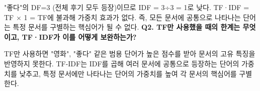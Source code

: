 \documentclass[a4paper,11pt]{article}
\begin{document}
\noindent\small\color{gray} "좋다"의 DF=3 (전체 후기 모두 등장)이므로 IDF = 3÷3 = 1로 낮다. TF·IDF = TF × 1 = TF에 불과해 가중치 효과가 없다. 즉, 모든 문서에 공통으로 나타나는 단어는 특정 문서를 구별하는 핵심어가 될 수 없다.
\vspace{2mm}
\noindent\textbf{Q2. TF만 사용했을 때의 한계는 무엇이고, TF·IDF가 이를 어떻게 보완하는가?}

\noindent\small\color{gray} TF만 사용하면 "영화", "좋다" 같은 범용 단어가 높은 점수를 받아 문서의 고유 특징을 반영하지 못한다. TF-IDF는 IDF를 곱해 여러 문서에 공통으로 등장하는 단어의 가중치를 낮추고, 특정 문서에만 나타나는 단어의 가중치를 높여 각 문서의 핵심어를 구별한다.
\vspace{2mm}
\par\vspace{3mm}
\end{document}
